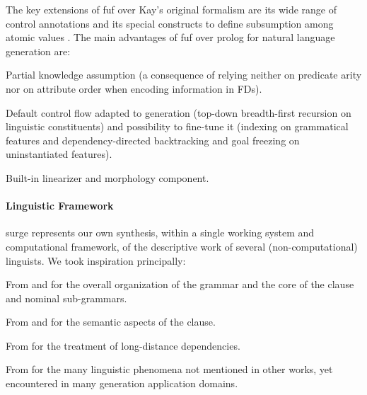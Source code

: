 The key extensions of {\sc fuf} over Kay's original formalism are its
wide range of control annotations \cite{elhadad-robin92} and its special
constructs to define subsumption among atomic values \cite{elhadad90}.  The
main advantages of {\sc fuf} over {\sc prolog} for
natural language generation are:  
\begin{zitemize} 
\item Partial knowledge assumption (a consequence of relying neither on
  predicate arity nor on attribute order when encoding information in FDs).

\item Default control flow adapted to generation 
(top-down breadth-first recursion on linguistic constituents) and possibility
  to fine-tune it (indexing on grammatical features and dependency-directed
  backtracking and goal freezing on uninstantiated features).

\item Built-in linearizer and morphology component.
\end{zitemize}


\paragraph{Linguistic Framework} 

{\sc surge} represents our own synthesis, within a single working system
and computational framework, of the descriptive work of several
(non-computational) linguists. We took inspiration principally:
\begin{zitemize}
\item From \cite{halliday94} and \cite{winograd} for the overall
  organization of the grammar and the core of the clause and nominal
  sub-grammars.

\item From \cite{fawcett} and \cite{lyons77} for the semantic aspects of
  the clause.

\item From \cite{pollard-sag94} for the treatment of long-distance
  dependencies.

\item From \cite{quirk-et-al85} for the many linguistic phenomena not
  mentioned in other works, yet encountered in many generation application
  domains.
\end{zitemize}

